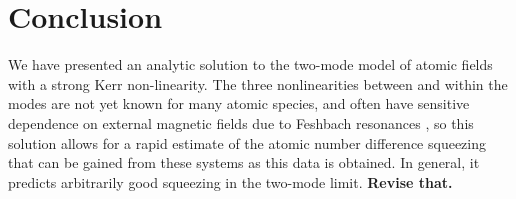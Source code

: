 \documentclass{iopart}
\begin{document}




\section{Conclusion}
\label{sectionConclusion}

We have presented an analytic solution to the two-mode model of atomic fields with a strong Kerr non-linearity.  The three nonlinearities between and within the modes are not yet known for many atomic species, and often have sensitive dependence on external magnetic fields due to Feshbach resonances \cite{FeshbachOrReview}, so this solution allows for a rapid estimate of the atomic number difference squeezing that can be gained from these systems as this data is obtained.  In general, it predicts arbitrarily good squeezing in the two-mode limit. \textbf{Revise that.}
\end{document}
